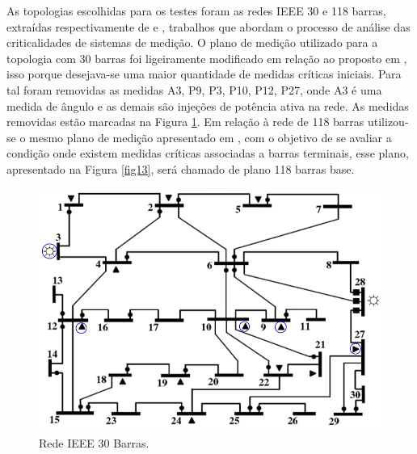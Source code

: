 \documentclass[12pt]{article}
\begin{document}
As topologias escolhidas para os testes foram as redes IEEE 30 e 118 barras, extraídas respectivamente de \cite{BB16} e \cite{Quant13}, trabalhos que abordam o processo de análise das criticalidades de sistemas de medição. O plano de medição utilizado para a topologia com 30 barras foi ligeiramente modificado em relação ao proposto em \cite{BB16}, isso porque desejava-se uma maior quantidade de medidas críticas iniciais. Para tal foram removidas as medidas A3, P9, P3, P10, P12, P27, onde A3 é uma medida de ângulo e as demais são injeções de potência ativa na rede. As medidas removidas estão marcadas na Figura \ref{fig12}. Em relação à rede de 118 barras utilizou-se o mesmo plano de medição apresentado em \cite{Quant13}, com o objetivo de se avaliar a condição onde existem medidas críticas associadas a barras terminais, esse plano, apresentado na Figura \ref{fig13}, será chamado de plano 118 barras base.


\begin{figure}[H]
	\centering 
	\includegraphics[scale=0.7]{figuras/Rede30bus.jpg}
	\caption{Rede IEEE 30 Barras.\cite{BB16}}
	\label{fig12} %
\end{figure}
\end{document}
